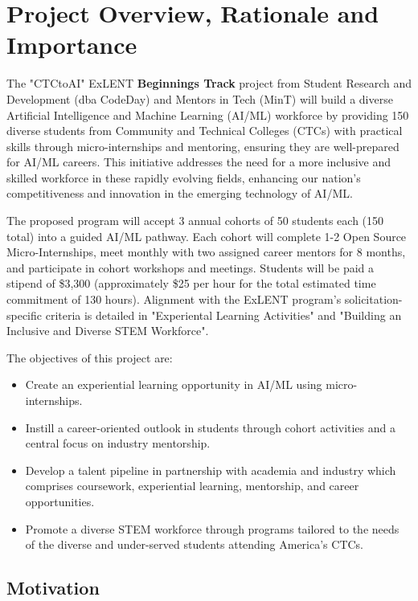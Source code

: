 \section{Project Overview, Rationale and Importance}

The "CTCtoAI" ExLENT \textbf{Beginnings Track} project from Student Research and Development (dba CodeDay) and Mentors in Tech (MinT) will build a diverse Artificial Intelligence and Machine Learning (AI/ML) workforce by providing 150 diverse students from Community and Technical Colleges (CTCs) with practical skills through micro-internships and mentoring, ensuring they are well-prepared for AI/ML careers. This initiative addresses the need for a more inclusive and skilled workforce in these rapidly evolving fields, enhancing our nation's competitiveness and innovation in the emerging technology of AI/ML.

The proposed program will accept 3 annual cohorts of 50 students each (150 total) into a guided AI/ML pathway. Each cohort will complete 1-2 Open Source Micro-Internships, meet monthly with two assigned career mentors for 8 months, and participate in cohort workshops and meetings. Students will be paid a stipend of \$3,300 (approximately \$25 per hour for the total estimated time commitment of 130 hours). Alignment with the ExLENT program’s solicitation-specific criteria is detailed in "Experiental Learning Activities" and "Building an Inclusive and Diverse STEM Workforce". 



The objectives of this project are:

\begin{itemize}
    \item Create an experiential learning opportunity in AI/ML using micro-internships.
    \item Instill a career-oriented outlook in students through cohort activities and a central focus on industry mentorship.
    \item Develop a talent pipeline in partnership with academia and industry which comprises coursework, experiential learning, mentorship, and career opportunities.
    \item Promote a diverse STEM workforce through programs tailored to the needs of the diverse and under-served students attending America’s CTCs.
\end{itemize}

\subsection{Motivation}

